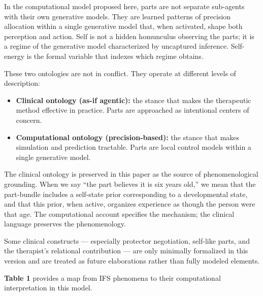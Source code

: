 \documentclass[11pt]{article}
\providecommand{\tightlist}{%
  \setlength{\itemsep}{0pt}\setlength{\parskip}{0pt}}
\begin{document}
In the computational model proposed here, parts are not separate
sub-agents with their own generative models. They are learned patterns
of precision allocation within a single generative model that, when
activated, shape both perception and action. Self is not a hidden
homunculus observing the parts; it is a regime of the generative model
characterized by uncaptured inference. Self-energy is the formal
variable that indexes which regime obtains.

These two ontologies are not in conflict. They operate at different
levels of description:

\begin{itemize}
\tightlist
\item
  \textbf{Clinical ontology (as-if agentic):} the stance that makes the
  therapeutic method effective in practice. Parts are approached as
  intentional centers of concern.
\item
  \textbf{Computational ontology (precision-based):} the stance that
  makes simulation and prediction tractable. Parts are local control
  models within a single generative model.
\end{itemize}

The clinical ontology is preserved in this paper as the source of
phenomenological grounding. When we say ``the part believes it is six
years old,'' we mean that the part-bundle includes a self-state prior
corresponding to a developmental state, and that this prior, when
active, organizes experience as though the person were that age. The
computational account specifies the mechanism; the clinical language
preserves the phenomenology.

Some clinical constructs --- especially protector negotiation, self-like
parts, and the therapist's relational contribution --- are only
minimally formalized in this version and are treated as future
elaborations rather than fully modeled elements.

\textbf{Table 1} provides a map from IFS phenomena to their
computational interpretation in this model.
\end{document}
